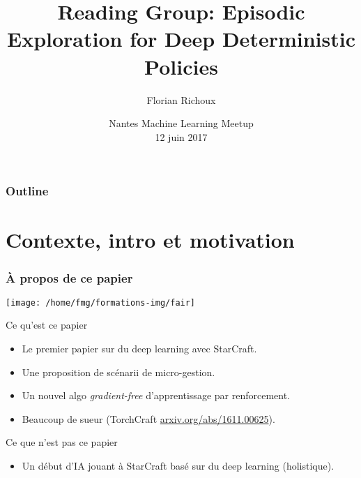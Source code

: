 \documentclass[smaller]{beamer}
\title[Reading group StarCraft AI]{Reading Group: Episodic Exploration for Deep Deterministic Policies}
\author{Florian Richoux}
\date[12/06/17]{Nantes Machine Learning Meetup\\12 juin 2017}
\begin{document}

\frame{\titlepage}


\begin{frame}
  \frametitle{Outline}

  \tableofcontents

\end{frame}


\section{Contexte, intro et motivation}

\begin{frame}
  \frametitle{À propos de ce papier}

  \centerline{\texttt{[image: /home/fmg/formations-img/fair]}}

  \bigskip

  {
    \begin{block}{Ce qu'est ce papier}
      \begin{itemize}
      \item<2-> Le premier papier sur du deep learning avec StarCraft.
      \item<3-> Une proposition de scénarii de micro-gestion.
      \item<4-> Un nouvel algo {\it gradient-free} d'apprentissage par renforcement.
      \item<5-> Beaucoup de sueur (TorchCraft \href{https://arxiv.org/abs/1611.00625}{arxiv.org/abs/1611.00625}).
      \end{itemize}
    \end{block}
  }
  
  \medskip

  {
    \begin{alertblock}{Ce que n'est pas ce papier}
      \begin{itemize}
      \item Un début d'IA jouant à StarCraft basé sur du deep learning (holistique).
      \end{itemize}
    \end{alertblock}
  }
  
\end{frame}
\end{document}
